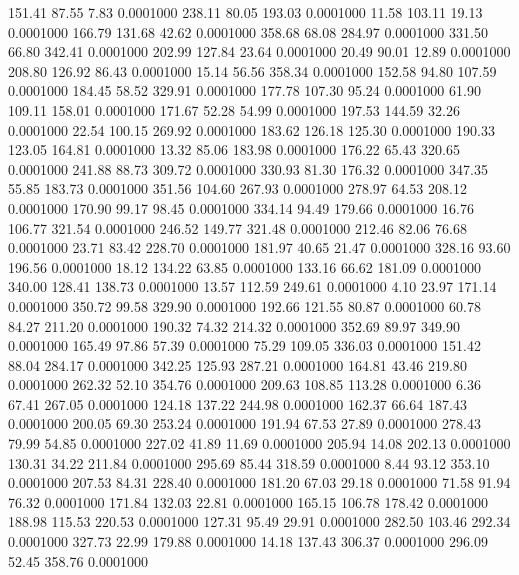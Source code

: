  151.41   87.55    7.83   0.0001000
 238.11   80.05  193.03   0.0001000
  11.58  103.11   19.13   0.0001000
 166.79  131.68   42.62   0.0001000
 358.68   68.08  284.97   0.0001000
 331.50   66.80  342.41   0.0001000
 202.99  127.84   23.64   0.0001000
  20.49   90.01   12.89   0.0001000
 208.80  126.92   86.43   0.0001000
  15.14   56.56  358.34   0.0001000
 152.58   94.80  107.59   0.0001000
 184.45   58.52  329.91   0.0001000
 177.78  107.30   95.24   0.0001000
  61.90  109.11  158.01   0.0001000
 171.67   52.28   54.99   0.0001000
 197.53  144.59   32.26   0.0001000
  22.54  100.15  269.92   0.0001000
 183.62  126.18  125.30   0.0001000
 190.33  123.05  164.81   0.0001000
  13.32   85.06  183.98   0.0001000
 176.22   65.43  320.65   0.0001000
 241.88   88.73  309.72   0.0001000
 330.93   81.30  176.32   0.0001000
 347.35   55.85  183.73   0.0001000
 351.56  104.60  267.93   0.0001000
 278.97   64.53  208.12   0.0001000
 170.90   99.17   98.45   0.0001000
 334.14   94.49  179.66   0.0001000
  16.76  106.77  321.54   0.0001000
 246.52  149.77  321.48   0.0001000
 212.46   82.06   76.68   0.0001000
  23.71   83.42  228.70   0.0001000
 181.97   40.65   21.47   0.0001000
 328.16   93.60  196.56   0.0001000
  18.12  134.22   63.85   0.0001000
 133.16   66.62  181.09   0.0001000
 340.00  128.41  138.73   0.0001000
  13.57  112.59  249.61   0.0001000
   4.10   23.97  171.14   0.0001000
 350.72   99.58  329.90   0.0001000
 192.66  121.55   80.87   0.0001000
  60.78   84.27  211.20   0.0001000
 190.32   74.32  214.32   0.0001000
 352.69   89.97  349.90   0.0001000
 165.49   97.86   57.39   0.0001000
  75.29  109.05  336.03   0.0001000
 151.42   88.04  284.17   0.0001000
 342.25  125.93  287.21   0.0001000
 164.81   43.46  219.80   0.0001000
 262.32   52.10  354.76   0.0001000
 209.63  108.85  113.28   0.0001000
   6.36   67.41  267.05   0.0001000
 124.18  137.22  244.98   0.0001000
 162.37   66.64  187.43   0.0001000
 200.05   69.30  253.24   0.0001000
 191.94   67.53   27.89   0.0001000
 278.43   79.99   54.85   0.0001000
 227.02   41.89   11.69   0.0001000
 205.94   14.08  202.13   0.0001000
 130.31   34.22  211.84   0.0001000
 295.69   85.44  318.59   0.0001000
   8.44   93.12  353.10   0.0001000
 207.53   84.31  228.40   0.0001000
 181.20   67.03   29.18   0.0001000
  71.58   91.94   76.32   0.0001000
 171.84  132.03   22.81   0.0001000
 165.15  106.78  178.42   0.0001000
 188.98  115.53  220.53   0.0001000
 127.31   95.49   29.91   0.0001000
 282.50  103.46  292.34   0.0001000
 327.73   22.99  179.88   0.0001000
  14.18  137.43  306.37   0.0001000
 296.09   52.45  358.76   0.0001000
